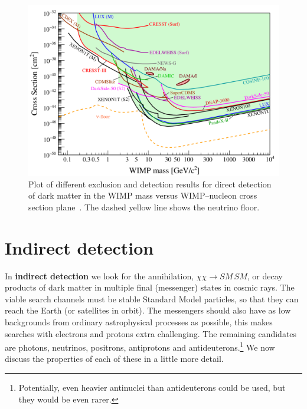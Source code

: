 \documentclass[notes.tex]{subfiles}
\begin{document}
\begin{figure}[h!]
\begin{center}
\includegraphics[width=\textwidth]{figures/APPEC_si_current_limits} 
\caption{Plot of different exclusion and detection results for direct detection of dark matter in the WIMP mass versus WIMP--nucleon cross section plane~\cite{Billard:2764484}. The dashed yellow line shows the neutrino floor. }
\label{fig:DD_exclusion}
\end{center}
\end{figure}


\section{Indirect detection}
In {\bf indirect detection} we look for the annihilation, $\chi\chi\to SM\, SM$, or decay products of dark matter in multiple final (messenger) states in cosmic rays. The viable search channels must be stable Standard Model particles, so that they can reach the Earth (or satellites in orbit). The messengers should also have as low backgrounds from ordinary astrophysical processes as possible, this makes searches with electrons and protons extra challenging. The remaining candidates are photons, neutrinos, positrons, antiprotons and antideuterons.\footnote{Potentially, even heavier antinuclei than antideuterons could be used, but they would be even rarer.} We now discuss the properties of each of these in a little more detail.

%
\end{document}
